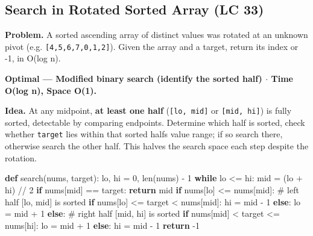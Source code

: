 \documentclass[11pt]{article}
\newenvironment{Shaded}{\begin{snugshade}}{\end{snugshade}}
\newcommand{\BuiltInTok}[1]{\textcolor[rgb]{0.50,0.55,0.55}{#1}}
\newcommand{\CommentTok}[1]{\textcolor[rgb]{0.48,0.49,0.49}{#1}}
\newcommand{\ControlFlowTok}[1]{\textcolor[rgb]{0.99,0.74,0.29}{\textbf{#1}}}
\newcommand{\DecValTok}[1]{\textcolor[rgb]{0.96,0.45,0.00}{#1}}
\newcommand{\KeywordTok}[1]{\textcolor[rgb]{0.81,0.81,0.76}{\textbf{#1}}}
\newcommand{\NormalTok}[1]{\textcolor[rgb]{0.81,0.81,0.76}{#1}}
\newcommand{\OperatorTok}[1]{\textcolor[rgb]{0.81,0.81,0.76}{#1}}
\begin{document}
\subsection{Search in Rotated Sorted Array (LC 33)}\label{search-in-rotated-sorted-array-lc-33}

\textbf{Problem.} A sorted ascending array of distinct values was rotated at an unknown pivot (e.g. \texttt{{[}4,5,6,7,0,1,2{]}}). Given the array and a target, return its index or -1, in O(log n).

\textbf{Optimal --- Modified binary search (identify the sorted half) \(\cdot\) Time O(log n), Space O(1).}

\textbf{Idea.} At any midpoint, \textbf{at least one half} (\texttt{{[}lo,\ mid{]}} or \texttt{{[}mid,\ hi{]}}) is fully sorted, detectable by comparing endpoints. Determine which half is sorted, check whether \texttt{target} lies within that sorted half\textquotesingle s value range; if so search there, otherwise search the other half. This halves the search space each step despite the rotation.


\begin{Shaded}
\begin{Highlighting}[]
\KeywordTok{def}\NormalTok{ search(nums, target):}
\NormalTok{    lo, hi }\OperatorTok{=} \DecValTok{0}\NormalTok{, }\BuiltInTok{len}\NormalTok{(nums) }\OperatorTok{{-}} \DecValTok{1}
    \ControlFlowTok{while}\NormalTok{ lo }\OperatorTok{\textless{}=}\NormalTok{ hi:}
\NormalTok{        mid }\OperatorTok{=}\NormalTok{ (lo }\OperatorTok{+}\NormalTok{ hi) }\OperatorTok{//} \DecValTok{2}
        \ControlFlowTok{if}\NormalTok{ nums[mid] }\OperatorTok{==}\NormalTok{ target:}
            \ControlFlowTok{return}\NormalTok{ mid}
        \ControlFlowTok{if}\NormalTok{ nums[lo] }\OperatorTok{\textless{}=}\NormalTok{ nums[mid]:              }\CommentTok{\# left half [lo, mid] is sorted}
            \ControlFlowTok{if}\NormalTok{ nums[lo] }\OperatorTok{\textless{}=}\NormalTok{ target }\OperatorTok{\textless{}}\NormalTok{ nums[mid]:}
\NormalTok{                hi }\OperatorTok{=}\NormalTok{ mid }\OperatorTok{{-}} \DecValTok{1}
            \ControlFlowTok{else}\NormalTok{:}
\NormalTok{                lo }\OperatorTok{=}\NormalTok{ mid }\OperatorTok{+} \DecValTok{1}
        \ControlFlowTok{else}\NormalTok{:                                   }\CommentTok{\# right half [mid, hi] is sorted}
            \ControlFlowTok{if}\NormalTok{ nums[mid] }\OperatorTok{\textless{}}\NormalTok{ target }\OperatorTok{\textless{}=}\NormalTok{ nums[hi]:}
\NormalTok{                lo }\OperatorTok{=}\NormalTok{ mid }\OperatorTok{+} \DecValTok{1}
            \ControlFlowTok{else}\NormalTok{:}
\NormalTok{                hi }\OperatorTok{=}\NormalTok{ mid }\OperatorTok{{-}} \DecValTok{1}
    \ControlFlowTok{return} \OperatorTok{{-}}\DecValTok{1}
\end{Highlighting}
\end{Shaded}
\end{document}

